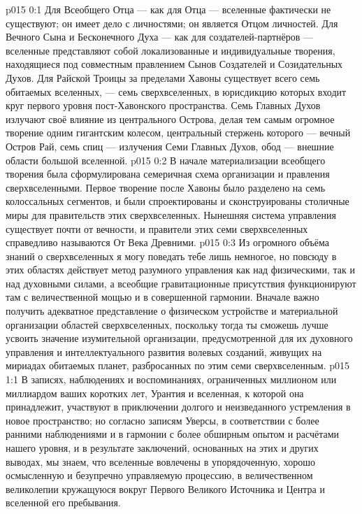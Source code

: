\author{Всеобщий Цензор}
\vs p015 0:1  Для Всеобщего Отца --- как для Отца --- вселенные фактически не существуют; он имеет дело с личностями; он является Отцом личностей. Для Вечного Сына и Бесконечного Духа --- как для создателей\hyp{}партнёров --- вселенные представляют собой локализованные и индивидуальные творения, находящиеся под совместным правлением Сынов Создателей и Созидательных Духов. Для Райской Троицы за пределами Хавоны существует всего семь обитаемых вселенных, --- семь сверхвселенных, в юрисдикцию которых входит круг первого уровня пост\hyp{}Хавонского пространства. Семь Главных Духов излучают своё влияние из центрального Острова, делая тем самым огромное творение одним гигантским колесом, центральный стержень которого --- вечный Остров Рай, семь спиц --- излучения Семи Главных Духов, обод --- внешние области большой вселенной.
\vs p015 0:2 В начале материализации всеобщего творения была сформулирована семеричная схема организации и правления сверхвселенными. Первое творение после Хавоны было разделено на семь колоссальных сегментов, и были спроектированы и сконструированы столичные миры для правительств этих сверхвселенных. Нынешняя система управления существует почти от вечности, и правители этих семи сверхвселенных справедливо называются От Века Древними.
\vs p015 0:3 Из огромного объёма знаний о сверхвселенных я могу поведать тебе лишь немногое, но повсюду в этих областях действует метод разумного управления как над физическими, так и над духовными силами, а всеобщие гравитационные присутствия функционируют там с величественной мощью и в совершенной гармонии. Вначале важно получить адекватное представление о физическом устройстве и материальной организации областей сверхвселенных, поскольку тогда ты сможешь лучше усвоить значение изумительной организации, предусмотренной для их духовного управления и интеллектуального развития волевых созданий, живущих на мириадах обитаемых планет, разбросанных по этим семи сверхвселенным.
\vs p015 1:1 В записях, наблюдениях и воспоминаниях, ограниченных миллионом или миллиардом ваших коротких лет, Урантия и вселенная, к которой она принадлежит, участвуют в приключении долгого и неизведанного устремления в новое пространство; но согласно записям Уверсы, в соответствии с более ранними наблюдениями и в гармонии с более обширным опытом и расчётами нашего уровня, и в результате заключений, основанных на этих и других выводах, мы знаем, что вселенные вовлечены в упорядоченную, хорошо осмысленную и безупречно управляемую процессию, в величественном великолепии кружащуюся вокруг Первого Великого Источника и Центра и вселенной его пребывания.
